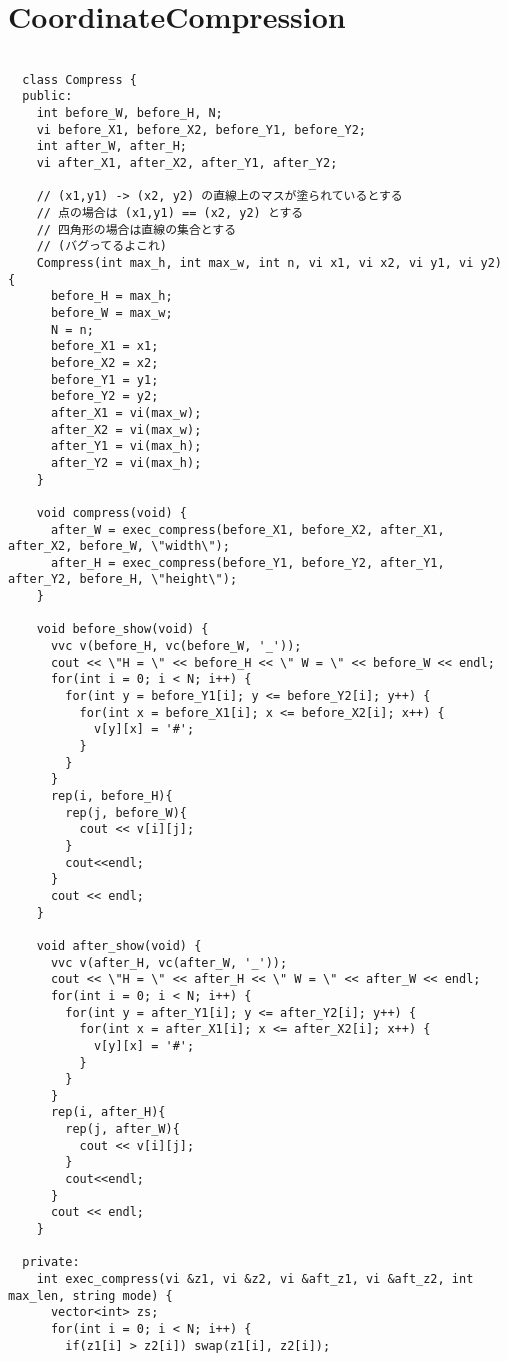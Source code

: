 \documentclass{jsarticle}
\begin{document}
\section{CoordinateCompression}
\color{black}
\begin{lstlisting}[caption=CoordinateCompression]

  class Compress {
  public:
    int before_W, before_H, N;
    vi before_X1, before_X2, before_Y1, before_Y2;
    int after_W, after_H;
    vi after_X1, after_X2, after_Y1, after_Y2;
    
    // (x1,y1) -> (x2, y2) の直線上のマスが塗られているとする
    // 点の場合は (x1,y1) == (x2, y2) とする
    // 四角形の場合は直線の集合とする
    // (バグってるよこれ)
    Compress(int max_h, int max_w, int n, vi x1, vi x2, vi y1, vi y2) {
      before_H = max_h;
      before_W = max_w;
      N = n;
      before_X1 = x1;
      before_X2 = x2;
      before_Y1 = y1;
      before_Y2 = y2;
      after_X1 = vi(max_w);
      after_X2 = vi(max_w);
      after_Y1 = vi(max_h);
      after_Y2 = vi(max_h);
    }
  
    void compress(void) {
      after_W = exec_compress(before_X1, before_X2, after_X1, after_X2, before_W, \"width\");
      after_H = exec_compress(before_Y1, before_Y2, after_Y1, after_Y2, before_H, \"height\");
    }
  
    void before_show(void) {
      vvc v(before_H, vc(before_W, '_'));
      cout << \"H = \" << before_H << \" W = \" << before_W << endl;
      for(int i = 0; i < N; i++) {
        for(int y = before_Y1[i]; y <= before_Y2[i]; y++) {
          for(int x = before_X1[i]; x <= before_X2[i]; x++) {
            v[y][x] = '#';
          }
        }
      }
      rep(i, before_H){
        rep(j, before_W){
          cout << v[i][j];
        }
        cout<<endl;
      }
      cout << endl;
    }
  
    void after_show(void) {
      vvc v(after_H, vc(after_W, '_'));
      cout << \"H = \" << after_H << \" W = \" << after_W << endl;
      for(int i = 0; i < N; i++) {
        for(int y = after_Y1[i]; y <= after_Y2[i]; y++) {
          for(int x = after_X1[i]; x <= after_X2[i]; x++) {
            v[y][x] = '#';
          }
        }
      }
      rep(i, after_H){
        rep(j, after_W){
          cout << v[i][j];
        }
        cout<<endl;
      }
      cout << endl;
    }
  
  private:
    int exec_compress(vi &z1, vi &z2, vi &aft_z1, vi &aft_z2, int max_len, string mode) {
      vector<int> zs;
      for(int i = 0; i < N; i++) {
        if(z1[i] > z2[i]) swap(z1[i], z2[i]);
  

\end{lstlisting}
\end{document}
